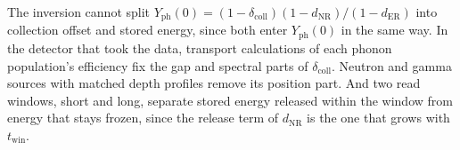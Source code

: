 The inversion cannot split $Y_{\mathrm{ph}}(0) = (1 - \delta_{\mathrm{coll}})(1 - d_{\mathrm{NR}})/(1 - d_{\mathrm{ER}})$ into collection offset and stored energy, since both enter $Y_{\mathrm{ph}}(0)$ in the same way. In the detector that took the data, transport calculations of each phonon population's efficiency fix the gap and spectral parts of $\delta_{\mathrm{coll}}$. Neutron and gamma sources with matched depth profiles remove its position part. And two read windows, short and long, separate stored energy released within the window from energy that stays frozen, since the release term of $d_{\mathrm{NR}}$ is the one that grows with $t_{\mathrm{win}}$.
